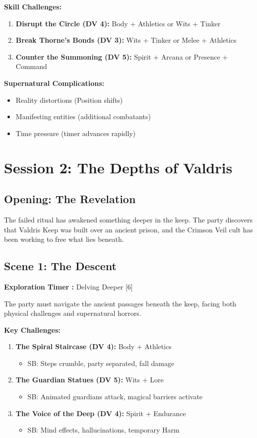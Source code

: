 \documentclass[11pt]{article}
\begin{document}
\textbf{Skill Challenges:}
\begin{enumerate}[leftmargin=*]
\item \textbf{Disrupt the Circle (DV 4):} Body + Athletics or Wits + Tinker
\item \textbf{Break Thorne's Bonds (DV 3):} Wits + Tinker or Melee + Athletics
\item \textbf{Counter the Summoning (DV 5):} Spirit + Arcana or Presence + Command
\end{enumerate}

\textbf{Supernatural Complications:}
\begin{itemize}[leftmargin=*]
\item Reality distortions (Position shifts)
\item Manifesting entities (additional combatants)
\item Time pressure (timer advances rapidly)
\end{itemize}

\section*{Session 2: The Depths of Valdris}

\subsection*{Opening: The Revelation}
The failed ritual has awakened something deeper in the keep. The party discovers that Valdris Keep was built over an ancient prison, and the Crimson Veil cult has been working to free what lies beneath.

\subsection*{Scene 1: The Descent}
\textbf{Exploration Timer :} Delving Deeper [6]

The party must navigate the ancient passages beneath the keep, facing both physical challenges and supernatural horrors.

\textbf{Key Challenges:}
\begin{enumerate}[leftmargin=*]
\item \textbf{The Spiral Staircase (DV 4):} Body + Athletics
\begin{itemize}
\item SB: Steps crumble, party separated, fall damage
\end{itemize}

\item \textbf{The Guardian Statues (DV 5):} Wits + Lore
\begin{itemize}
\item SB: Animated guardians attack, magical barriers activate
\end{itemize}

\item \textbf{The Voice of the Deep (DV 4):} Spirit + Endurance
\begin{itemize}
\item SB: Mind effects, hallucinations, temporary Harm
\end{itemize}
\end{enumerate}
\end{document}
